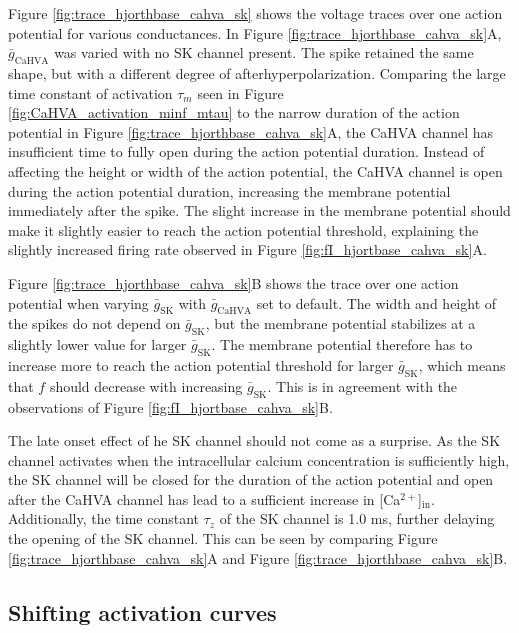 \documentclass[times, twoside]{zHenriquesLab-StyleBioRxiv}
\begin{document}
Figure \ref{fig:trace_hjorthbase_cahva_sk} shows the voltage traces over one action potential for various conductances. In Figure \ref{fig:trace_hjorthbase_cahva_sk}A, $\bar{g}_\text{CaHVA}$ was varied with no SK channel present. The spike retained the same shape, but with a different degree of afterhyperpolarization. Comparing the large time constant of activation $\tau_m$ seen in Figure \ref{fig:CaHVA_activation_minf_mtau} to the narrow duration of the action potential in Figure \ref{fig:trace_hjorthbase_cahva_sk}A, the CaHVA channel has insufficient time to fully open during the action potential duration. Instead of affecting the height or width of the action potential, the CaHVA channel is open during the action potential duration, increasing the membrane potential immediately after the spike. The slight increase in the membrane potential should make it slightly easier to reach the action potential threshold, explaining the slightly increased firing rate observed in Figure \ref{fig:fI_hjortbase_cahva_sk}A.

Figure \ref{fig:trace_hjorthbase_cahva_sk}B shows the trace over one action potential when varying $\bar{g}_\text{SK}$ with $\bar{g}_\text{CaHVA}$
 set to default. The width and height of the spikes do not depend on $\bar{g}_\text{SK}$, but the membrane potential stabilizes at a slightly lower value for larger $\bar{g}_\text{SK}$. The membrane potential therefore has to increase more to reach the action potential threshold for larger $\bar{g}_\text{SK}$, which means that $f$ should decrease with increasing $\bar{g}_\text{SK}$. This is in agreement with the observations of Figure \ref{fig:fI_hjortbase_cahva_sk}B.
 
 The late onset effect of he SK channel should not come as a surprise. As the SK channel activates when the intracellular calcium concentration is sufficiently high, the SK channel will be closed for the duration of the action potential and open after the CaHVA channel has lead to a sufficient increase in [Ca$^{2+}$]$_\text{in}$. Additionally, the time constant $\tau_z$ of the SK channel is 1.0 ms, further delaying the opening of the SK channel. This can be seen by comparing Figure \ref{fig:trace_hjorthbase_cahva_sk}A and Figure \ref{fig:trace_hjorthbase_cahva_sk}B. %


\subsection*{Shifting activation curves}
\end{document}

